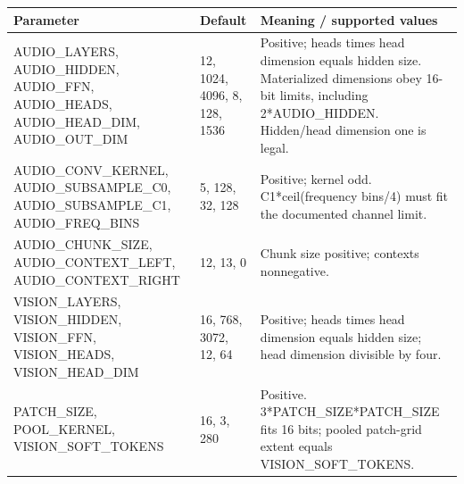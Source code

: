 \documentclass[11pt,a4paper]{article}
\begin{document}
{\small\renewcommand{\arraystretch}{1.18}\begin{longtable}{@{}L{0.22\textwidth}|L{0.21\textwidth}|L{0.49\textwidth}@{}}\toprule

\textbf{Parameter} & \textbf{Default} & \textbf{Meaning /\allowbreak{} supported values}\\\midrule\endhead

AUDIO\_\allowbreak{}LAYERS,\allowbreak{} AUDIO\_\allowbreak{}HIDDEN,\allowbreak{} AUDIO\_\allowbreak{}FFN,\allowbreak{} AUDIO\_\allowbreak{}HEADS,\allowbreak{} AUDIO\_\allowbreak{}HEAD\_\allowbreak{}DIM,\allowbreak{} AUDIO\_\allowbreak{}OUT\_\allowbreak{}DIM & 12,\allowbreak{} 1024,\allowbreak{} 4096,\allowbreak{} 8,\allowbreak{} 128,\allowbreak{} 1536 & Positive; heads times head dimension equals hidden size. Materialized dimensions obey 16-bit limits,\allowbreak{} including 2*\allowbreak{}AUDIO\_\allowbreak{}HIDDEN. Hidden/\allowbreak{}head dimension one is legal.\\[2pt]\hline

AUDIO\_\allowbreak{}CONV\_\allowbreak{}KERNEL,\allowbreak{} AUDIO\_\allowbreak{}SUBSAMPLE\_\allowbreak{}C0,\allowbreak{} AUDIO\_\allowbreak{}SUBSAMPLE\_\allowbreak{}C1,\allowbreak{} AUDIO\_\allowbreak{}FREQ\_\allowbreak{}BINS & 5,\allowbreak{} 128,\allowbreak{} 32,\allowbreak{} 128 & Positive; kernel odd. C1*\allowbreak{}ceil(\allowbreak{}frequency bins/\allowbreak{}4)\allowbreak{} must fit the documented channel limit.\\[2pt]\hline

AUDIO\_\allowbreak{}CHUNK\_\allowbreak{}SIZE,\allowbreak{} AUDIO\_\allowbreak{}CONTEXT\_\allowbreak{}LEFT,\allowbreak{} AUDIO\_\allowbreak{}CONTEXT\_\allowbreak{}RIGHT & 12,\allowbreak{} 13,\allowbreak{} 0 & Chunk size positive; contexts nonnegative.\\[2pt]\hline

VISION\_\allowbreak{}LAYERS,\allowbreak{} VISION\_\allowbreak{}HIDDEN,\allowbreak{} VISION\_\allowbreak{}FFN,\allowbreak{} VISION\_\allowbreak{}HEADS,\allowbreak{} VISION\_\allowbreak{}HEAD\_\allowbreak{}DIM & 16,\allowbreak{} 768,\allowbreak{} 3072,\allowbreak{} 12,\allowbreak{} 64 & Positive; heads times head dimension equals hidden size; head dimension divisible by four.\\[2pt]\hline

PATCH\_\allowbreak{}SIZE,\allowbreak{} POOL\_\allowbreak{}KERNEL,\allowbreak{} VISION\_\allowbreak{}SOFT\_\allowbreak{}TOKENS & 16,\allowbreak{} 3,\allowbreak{} 280 & Positive. 3*\allowbreak{}PATCH\_\allowbreak{}SIZE*\allowbreak{}PATCH\_\allowbreak{}SIZE fits 16 bits; pooled patch-grid extent equals VISION\_\allowbreak{}SOFT\_\allowbreak{}TOKENS.\\[2pt]\hline


\end{longtable}}
\end{document}
